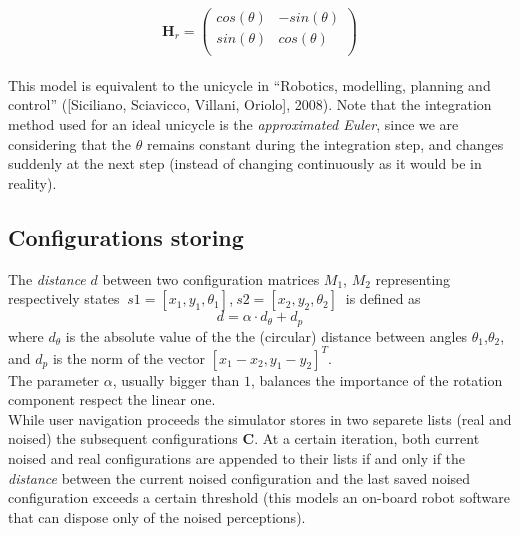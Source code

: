 \[ 
\textbf{H}_r =
\left( \begin{array}{cc}
  cos(\theta)  & -sin(\theta)\\ 
  sin(\theta)  & cos(\theta) \\
\end{array} \right)
\]\\

This model is equivalent to the unicycle in ``Robotics, modelling, planning and control'' ([Siciliano, Sciavicco, Villani, Oriolo], 2008).
Note that the integration method used for an ideal unicycle is the \textit{approximated Euler}, since we are considering that the $\theta$ remains constant during the integration step,
and changes suddenly at the next step (instead of changing continuously as it would be in reality).\\
\subsection{Configurations storing}
The \textit{distance} $d$ between two configuration matrices $M_1$, $M_2$ representing respectively states $~ s1 = [x_1,y_1,\theta_1]$,$~ s2 = [x_2,y_2,\theta_2]~$
is defined as
\[ 
d = \alpha \cdot d_{\theta} + d_p
\]
where $d_{\theta}$ is the absolute value of the the (circular) distance between angles $\theta_1$,$\theta_2$,
and $d_p$ is the norm of the vector $[x_1 - x_2,y_1 - y_2]^T$.\\
The parameter $\alpha$, usually bigger than $1$, balances the importance of the rotation component respect the linear one.\\
While user navigation proceeds the simulator stores in two separete lists (real and noised) the subsequent configurations $\textbf{C}$.
At a certain iteration, both current noised and real configurations are appended to their lists if and only if the \textit{distance} between the current noised configuration 
and the last saved noised configuration exceeds a certain threshold (this models an on-board robot software that can dispose only of the noised perceptions).\\
\\
